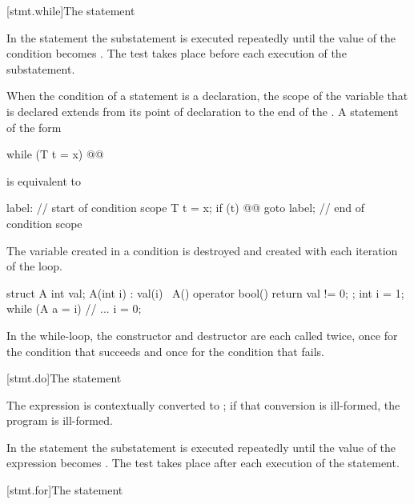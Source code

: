 [stmt.while]{The  statement}%

\pnum
In the  statement the substatement is executed repeatedly
until the value of the condition becomes
. The test takes place before each execution of the
substatement.

\pnum
{}%
When the condition of a  statement is a declaration, the scope of
the variable that is declared extends from its point of
declaration to the end of the 
. A  statement of the form

\begin{codeblock}
while (T t = x) @@
\end{codeblock}

is equivalent to

\begin{codeblock}
label:
{                   // start of condition scope
  T t = x;
  if (t) {
    @@
    goto label;
  }
}                   // end of condition scope
\end{codeblock}

The variable created in a condition is destroyed and created with each
iteration of the loop.
\begin{example}

\begin{codeblock}
struct A {
  int val;
  A(int i) : val(i) { }
  ~A() { }
  operator bool() { return val != 0; }
};
int i = 1;
while (A a = i) {
  // ...
  i = 0;
}
\end{codeblock}

In the while-loop, the constructor and destructor are each called twice,
once for the condition that succeeds and once for the condition that
fails.
\end{example}

[stmt.do]{The  statement}%

\pnum
The expression is contextually converted to ;
if that conversion is ill-formed, the program is ill-formed.

\pnum
In the  statement the substatement is executed repeatedly
until the value of the expression becomes . The test takes
place after each execution of the statement.

[stmt.for]{The  statement}%

